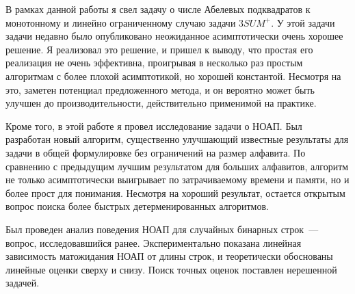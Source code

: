 В рамках данной работы я свел задачу о числе Абелевых подквадратов к монотонному и линейно ограниченному случаю задачи $3SUM^+$. У этой задачи задачи недавно было опубликовано неожиданное асимптотически очень хорошее решение. Я реализовал это решение, и пришел к выводу, что простая его реализация не очень эффективна, проигрывая в несколько раз простым алгоритмам с более плохой асимптотикой, но хорошей константой. Несмотря на это, заметен потенциал предложенного метода, и он вероятно может быть улучшен до производительности, действительно применимой на практике.

Кроме того, в этой работе я провел исследование задачи о НОАП. Был разработан новый алгоритм, существенно улучшающий известные результаты для задачи в общей формулировке без ограничений на размер алфавита. По сравнению с предыдущим лучшим результатом для больших алфавитов, алгоритм не только асимптотически выигрывает по затрачиваемому времени и памяти, но и более прост для понимания. Несмотря на хороший результат, остается открытым вопрос поиска более быстрых детерменированных алгоритмов.

Был проведен анализ поведения НОАП для случайных бинарных строк~--- вопрос, исследовавшийся ранее. Экспериментально показана линейная зависимость матожидания НОАП от длины строк, и теоретически обоснованы линейные оценки сверху и снизу. Поиск точных оценок поставлен нерешенной задачей.

